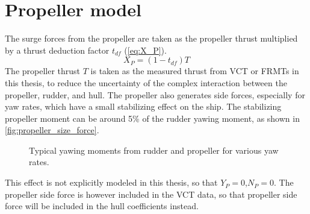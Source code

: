 \section{Propeller model} \label{sec:propeller}
The surge forces from the propeller are taken as the propeller thrust multiplied by a thrust deduction factor $t_{df}$ (\autoref{eq:X_P}).
\begin{equation}
    \label{eq:X_P}
    X_P = (1-t_{df})T
\end{equation}
The propeller thrust $T$ is taken as the measured thrust from VCT or FRMTs in this thesis, to reduce the uncertainty of the complex interaction between the propeller, rudder, and hull. The propeller also generates side forces, especially for yaw rates, which have a small stabilizing effect on the ship. The stabilizing propeller moment can be around 5\% of the rudder yawing moment, as shown in \autoref{fig:propeller_size_force}.
\begin{figure}[h]
    \centering
    

    \begin{minipage}[t]{5.25in}
    \caption{Typical yawing moments from rudder and propeller for various yaw rates.}
	\label{fig:propeller_size_force}
    \end{minipage}
        
\end{figure}
This effect is not explicitly modeled in this thesis, so that $Y_P=0$,$N_P=0$. The propeller side force is however included in the VCT data, so that propeller side force will be included in the hull coefficients instead.
